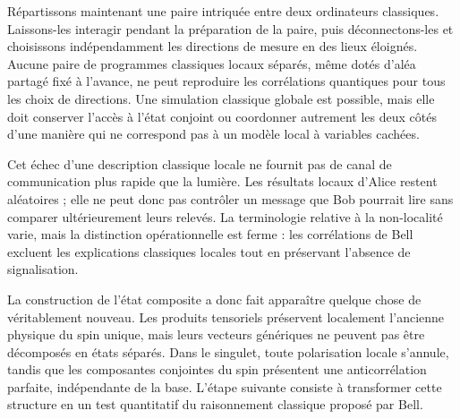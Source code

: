 Répartissons maintenant une paire intriquée entre deux ordinateurs classiques. Laissons-les interagir pendant la préparation de la paire, puis déconnectons-les et choisissons indépendamment les directions de mesure en des lieux éloignés. Aucune paire de programmes classiques locaux séparés, même dotés d’aléa partagé fixé à l’avance, ne peut reproduire les corrélations quantiques pour tous les choix de directions. Une simulation classique globale est possible, mais elle doit conserver l’accès à l’état conjoint ou coordonner autrement les deux côtés d’une manière qui ne correspond pas à un modèle local à variables cachées.

Cet échec d’une description classique locale ne fournit pas de canal de communication plus rapide que la lumière. Les résultats locaux d’Alice restent aléatoires ; elle ne peut donc pas contrôler un message que Bob pourrait lire sans comparer ultérieurement leurs relevés. La terminologie relative à la non-localité varie, mais la distinction opérationnelle est ferme : les corrélations de Bell excluent les explications classiques locales tout en préservant l’absence de signalisation.

La construction de l’état composite a donc fait apparaître quelque chose de véritablement nouveau. Les produits tensoriels préservent localement l’ancienne physique du spin unique, mais leurs vecteurs génériques ne peuvent pas être décomposés en états séparés. Dans le singulet, toute polarisation locale s’annule, tandis que les composantes conjointes du spin présentent une anticorrélation parfaite, indépendante de la base. L’étape suivante consiste à transformer cette structure en un test quantitatif du raisonnement classique proposé par Bell.

